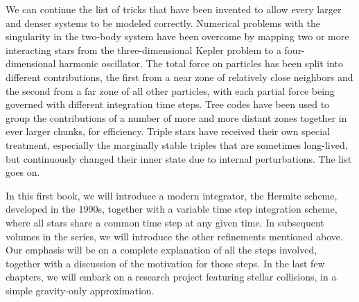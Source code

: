 We can continue the list of tricks that have been invented to allow
every larger and denser systems to be modeled correctly.  Numerical
problems with the singularity in the two-body system have been
overcome by mapping two or more interacting stars from the
three-dimensional Kepler problem to a four-dimensional harmonic
oscillator.  The total force on particles has been split into
different contributions, the first from a near zone of relatively
close neighbors and the second from a far zone of all other particles,
with each partial force being governed with different integration time
steps.  Tree codes have been used to group the contributions of a
number of more and more distant zones together in ever larger chunks,
for efficiency.  Triple stars have received their own special treatment,
especially the marginally stable triples that are sometimes long-lived, 
but continuously changed their inner state due to internal perturbations.
The list goes on.

In this first book, we will introduce a modern integrator, the Hermite
scheme, developed in the 1990s, together with a variable time step
integration scheme, where all stars share a common time step at any
given time.  In subsequent volumes in the series, we will introduce
the other refinements mentioned above.  Our emphasis will be on a
complete explanation of all the steps involved, together with a
discussion of the motivation for those steps.  In the last few
chapters, we will embark on a research project featuring stellar
collisions, in a simple gravity-only approximation.
